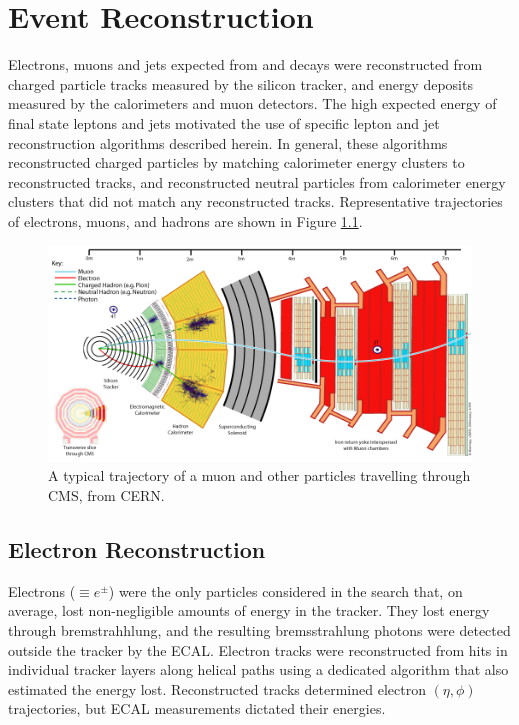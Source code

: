 \chapter{Event Reconstruction}
\label{sec:reco_chapter}

Electrons, muons and jets expected from \WR and \nul decays were reconstructed from charged particle 
tracks measured by the silicon tracker, and energy deposits measured by the calorimeters and muon 
detectors.  The high expected energy of final state leptons and jets motivated the use of specific 
lepton and jet reconstruction algorithms described herein.  In general, these algorithms reconstructed 
charged particles by matching calorimeter energy clusters to reconstructed tracks, and reconstructed 
neutral particles from calorimeter energy clusters that did not match any reconstructed tracks.  
Representative trajectories of electrons, muons, and hadrons are shown in Figure \ref{fig:particleTrajectories}.

\begin{figure}[h]
	\centering
	\includegraphics[width=1.0\textwidth]{figures/flowOfParticlesThroughCMS.gif}
	\caption{A typical trajectory of a muon and other particles travelling through CMS, from CERN.}
	\label{fig:particleTrajectories}
\end{figure}


\section{Electron Reconstruction}
\label{sec:eleReco}
Electrons ($\equiv e^{\pm}$) were the only particles considered in the \WR search that, on average, lost non-negligible 
amounts of energy in the tracker.  They lost energy through bremstrahhlung, and the resulting bremsstrahlung 
photons were detected outside the tracker by the ECAL.  Electron tracks were reconstructed from hits in 
individual tracker layers along helical paths using a dedicated algorithm that also estimated the energy lost.  
Reconstructed tracks determined electron $(\eta, \phi)$ trajectories, but ECAL measurements dictated their 
energies.

